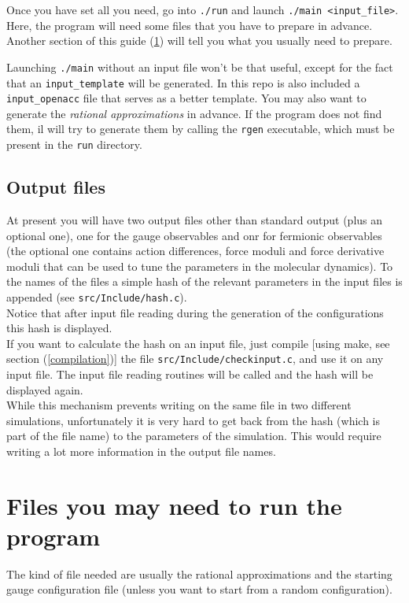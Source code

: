 Once you have set all you need, go into \verb|./run| and launch 
\verb|./main <input_file>|. Here, the program 
will  need some  files that you have to prepare in advance. Another section
of this guide (\ref{filesneeded}) will tell you what you usually need to 
prepare.

Launching \verb|./main| without an input file won't be that useful,
except for the fact that an \verb|input_template| will be generated.
In this repo is also included a \verb|input_openacc| file that serves as
a better template.
You may also want to generate the \emph{rational approximations} in advance. If 
the
program does not find them, il will try to generate them by calling 
the \verb|rgen| executable, which must be present in the \verb|run| directory.

\subsection{Output files}
At present you will have two output files other than standard output (plus an 
optional one), one for the gauge observables and onr for fermionic observables 
(the optional one contains action differences, force moduli and force 
derivative moduli that can be used to tune the parameters in the molecular 
dynamics). To the names of the files a simple hash of the relevant parameters 
in the input files is appended (see \verb|src/Include/hash.c|).\\
Notice that after input file reading during the generation of the 
configurations this hash is displayed.\\
If you want to calculate the hash on an input file, just compile [using make, 
see section (\ref{compilation})] the file \verb|src/Include/checkinput.c|, and 
use it on any input file. The input file reading routines will be called and 
the hash will be displayed again.\\
While this mechanism prevents writing on the same file in two 
different simulations, unfortunately it is very hard to get back from the hash 
(which is part of the file name) to the parameters of the simulation. This 
would require writing a lot more information in the output file names.

\section{Files you may need to run the program}
\label{filesneeded}
The kind of file needed are usually the rational approximations and
the starting gauge configuration file (unless you want to start from
a random configuration).

